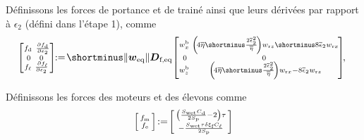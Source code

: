 \begin{algorithm}
\begin{algorithmic}[1]
\State Définissons les forces de portance et de trainé ainsi que leurs dérivées par rapport à $\epsilon_2$ (défini dans l'étape 1), comme
\begin{equation}
\label{eq:draglift_ALG}
\!\! \smallmat{\!f_{\text{d}} & \frac{\partial  f_{\text{d}}  }{\partial \epsilon_{2}} \!\! \\ 0 & 0  \\ \! f_{\ell} & \frac{\partial  f_{\ell} \!\! }{\partial \epsilon_{2}}} 
 \!\! := \! 
    \shortminus \| \boldsymbol{w}_{\mathrm{eq}} \|  \boldsymbol{D}_{\text{f,eq}}\! 
    \smallmat{\! w^{\text{b}}_{x} &  \left(\! 4 \overline{\eta}  \shortminus \frac{2\overline \epsilon_{2}^{2}}{\overline{\eta} } \! \right) w_{\text{r}z} \shortminus 8 \overline \epsilon_{2}  w_{\text{r}x} \!\! \\  0 & 0 \\  
   \! w^{\text{b}}_{z} &    \left(\! 4 \overline{\eta}  \shortminus \frac{2\overline \epsilon_{2}^{2}}{\overline{\eta} } \! \right) w_{\text{r}x} -8 \overline \epsilon_{2} w_{\text{r}z} \!\!
    }\!\!, 
\end{equation}

\State Définissons les forces des moteurs et des élevons comme
\begin{align}
\label{eq:motor_elevon_forces}
    \left[ \begin{smallmatrix} f_{\text{m}}  \\f_{\text{e}}  \end{smallmatrix} \right]\! := \!\left[ \begin{smallmatrix}\left(\frac{S_{\text{wet}}C_{\text{d}}}{2S_{\text{p}}}-2\right)\tau \\  - \frac{S_{\text{wet}}\tau \delta \xi_{\text{f}} C_{\ell}}{2S_{\text{p}}} \end{smallmatrix} \right]
\end{align}


\end{algorithmic}
\end{algorithm}
